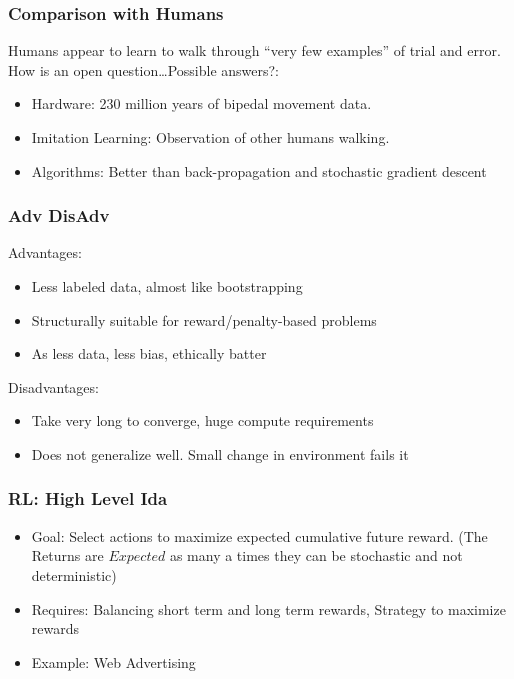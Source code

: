 \begin{frame}[fragile]\frametitle{Comparison with Humans}

Humans appear to learn to walk through ``very few examples'' of trial and error. How is an open question…Possible answers?:
\begin{itemize}
\item Hardware: 230 million years of bipedal movement data.
\item Imitation Learning: Observation of other humans walking.
\item Algorithms: Better than back-propagation and stochastic gradient descent
\end{itemize}


\end{frame}



\begin{frame}[fragile]\frametitle{Adv DisAdv}

Advantages:
\begin{itemize}
\item Less labeled data, almost like bootstrapping
\item Structurally suitable for reward/penalty-based problems
\item As less data, less bias, ethically batter
\end{itemize}

Disadvantages:
\begin{itemize}
\item Take very long to converge, huge compute requirements
\item Does not generalize well. Small change in environment fails it
\end{itemize}

\end{frame}


\begin{frame}[fragile]\frametitle{RL: High Level Ida}

\begin{itemize}
\item   Goal: Select actions to maximize expected cumulative future reward. (The Returns are $Expected$ as many a times they can be stochastic and not deterministic)
\item   Requires: Balancing short term and long term rewards, Strategy to maximize rewards
\item   Example: Web Advertising
\end{itemize}


\end{frame}




